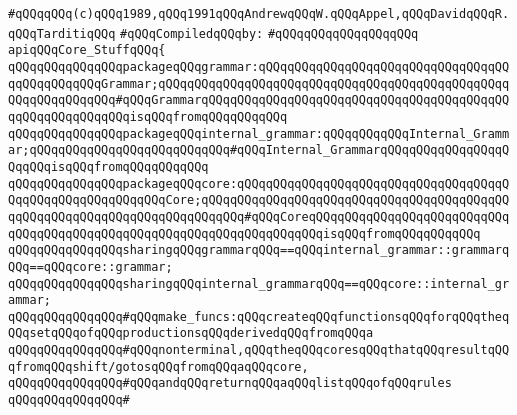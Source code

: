 \label{src/app/yacc/src/core-stuff.api}
\verb|#qQQqqQQq(c)qQQq1989,qQQq1991qQQqAndrewqQQqW.qQQqAppel,qQQqDavidqQQqR.qQQqTarditiqQQq|\newline
\newline
\verb|#qQQqCompiledqQQqby:|\newline
\verb|#qQQqqQQqqQQqqQQqqQQq|\newline
\newline
\verb|apiqQQqCore_StuffqQQq{|\newline
\newline
\verb|qQQqqQQqqQQqqQQqpackageqQQqgrammar:qQQqqQQqqQQqqQQqqQQqqQQqqQQqqQQqqQQqqQQqqQQqqQQqGrammar;qQQqqQQqqQQqqQQqqQQqqQQqqQQqqQQqqQQqqQQqqQQqqQQqqQQqqQQqqQQqqQQq#qQQqGrammarqQQqqQQqqQQqqQQqqQQqqQQqqQQqqQQqqQQqqQQqqQQqqQQqqQQqqQQqqQQqisqQQqfromqQQqqQQqqQQq|\newline
\verb|qQQqqQQqqQQqqQQqpackageqQQqinternal_grammar:qQQqqQQqqQQqInternal_Grammar;qQQqqQQqqQQqqQQqqQQqqQQqqQQq#qQQqInternal_GrammarqQQqqQQqqQQqqQQqqQQqqQQqisqQQqfromqQQqqQQqqQQq|\newline
\verb|qQQqqQQqqQQqqQQqpackageqQQqcore:qQQqqQQqqQQqqQQqqQQqqQQqqQQqqQQqqQQqqQQqqQQqqQQqqQQqqQQqqQQqCore;qQQqqQQqqQQqqQQqqQQqqQQqqQQqqQQqqQQqqQQqqQQqqQQqqQQqqQQqqQQqqQQqqQQqqQQqqQQq#qQQqCoreqQQqqQQqqQQqqQQqqQQqqQQqqQQqqQQqqQQqqQQqqQQqqQQqqQQqqQQqqQQqqQQqqQQqqQQqisqQQqfromqQQqqQQqqQQq|\newline
\newline
\verb|qQQqqQQqqQQqqQQqsharingqQQqgrammarqQQq==qQQqinternal_grammar::grammarqQQq==qQQqcore::grammar;|\newline
\verb|qQQqqQQqqQQqqQQqsharingqQQqinternal_grammarqQQq==qQQqcore::internal_grammar;|\newline
\newline
\verb|qQQqqQQqqQQqqQQq#qQQqmake_funcs:qQQqcreateqQQqfunctionsqQQqforqQQqtheqQQqsetqQQqofqQQqproductionsqQQqderivedqQQqfromqQQqa|\newline
\verb|qQQqqQQqqQQqqQQq#qQQqnonterminal,qQQqtheqQQqcoresqQQqthatqQQqresultqQQqfromqQQqshift/gotosqQQqfromqQQqaqQQqcore,|\newline
\verb|qQQqqQQqqQQqqQQq#qQQqandqQQqreturnqQQqaqQQqlistqQQqofqQQqrules|\newline
\verb|qQQqqQQqqQQqqQQq#|\newline
